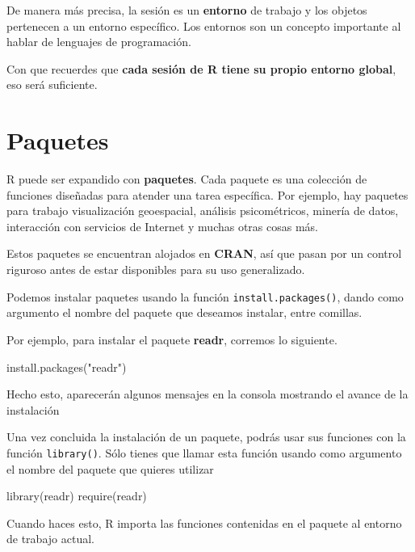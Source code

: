 \documentclass[
]{book}
\newenvironment{Shaded}{\begin{snugshade}}{\end{snugshade}}
\newcommand{\FunctionTok}[1]{\textcolor[rgb]{0.00,0.00,0.00}{#1}}
\newcommand{\NormalTok}[1]{#1}
\newcommand{\StringTok}[1]{\textcolor[rgb]{0.31,0.60,0.02}{#1}}
\begin{document}
De manera más precisa, la sesión es un \textbf{entorno} de trabajo y los objetos pertenecen a un entorno específico. Los entornos son un concepto importante al hablar de lenguajes de programación.

Con que recuerdes que \textbf{cada sesión de R tiene su propio entorno global}, eso será suficiente.

\hypertarget{paquetes}{%
\section{Paquetes}\label{paquetes}}

R puede ser expandido con \textbf{paquetes}. Cada paquete es una colección de funciones diseñadas para atender una tarea específica. Por ejemplo, hay paquetes para trabajo visualización geoespacial, análisis psicométricos, minería de datos, interacción con servicios de Internet y muchas otras cosas más.

Estos paquetes se encuentran alojados en \textbf{CRAN}, así que pasan por un control riguroso antes de estar disponibles para su uso generalizado.

Podemos instalar paquetes usando la función \texttt{install.packages()}, dando como argumento el nombre del paquete que deseamos instalar, entre comillas.

Por ejemplo, para instalar el paquete \textbf{readr}, corremos lo siguiente.

\begin{Shaded}
\begin{Highlighting}[]
\FunctionTok{install.packages}\NormalTok{(}\StringTok{"readr"}\NormalTok{)}
\end{Highlighting}
\end{Shaded}

Hecho esto, aparecerán algunos mensajes en la consola mostrando el avance de la instalación

Una vez concluida la instalación de un paquete, podrás usar sus funciones con la función \texttt{library()}. Sólo tienes que llamar esta función usando como argumento el nombre del paquete que quieres utilizar

\begin{Shaded}
\begin{Highlighting}[]
\FunctionTok{library}\NormalTok{(readr) }
\FunctionTok{require}\NormalTok{(readr)}
\end{Highlighting}
\end{Shaded}

Cuando haces esto, R importa las funciones contenidas en el paquete al entorno de trabajo actual.
\end{document}
